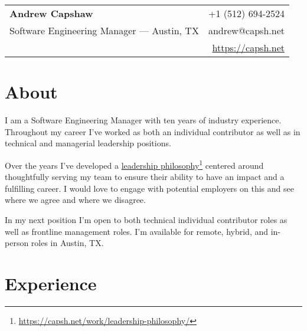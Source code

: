 \documentclass[11pt]{amsart}
\begin{document}
\pagestyle{fancy}

% 
%
\begin{tabularx}{\textwidth}{@{}Xr@{}}
\textbf{Andrew Capshaw} & +1 (512) 694-2524  \\
Software Engineering Manager — Austin, TX & andrew@capsh.net \\
& \href{https://capsh.net}{https://capsh.net} \\
\end{tabularx}


\section{About}

I am a Software Engineering Manager with ten years of industry experience. Throughout my career I've worked as both an individual contributor as well as in technical and managerial leadership positions. 

Over the years I've developed a \href{https://capsh.net/work/leadership-philosophy/}{leadership philosophy}\footnote{\url{https://capsh.net/work/leadership-philosophy/}} centered around thoughtfully serving my team to ensure their ability to have an impact and a fulfilling career. I would love to engage with potential employers on this and see where we agree and where we disagree.

In my next position I'm open to both technical individual contributor roles as well as frontline management roles. I'm available for remote, hybrid, and in-person roles in Austin, TX. 

\bigskip
\section{Experience}
\end{document}
